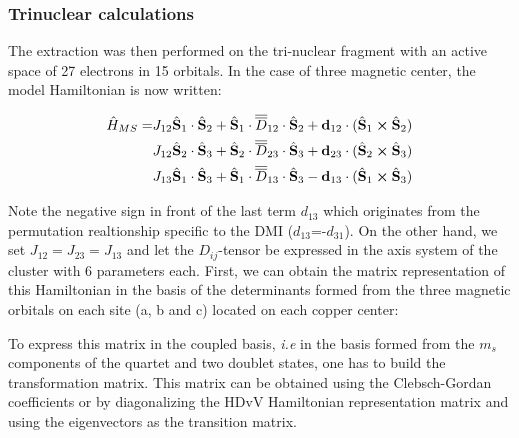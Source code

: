 \documentclass[12pt]{report}
\numberwithin{equation}{section}
\begin{document}
\subsubsection*{Trinuclear calculations}

The extraction was then performed on the tri-nuclear fragment with an active space of 27 electrons in 15 orbitals.
In the case of three magnetic center, the model Hamiltonian is now written:


\begin{equation}
    \begin{split}
    \hat{H}_{MS}=&J_{12} \hat{\vb S}_1 \cdot \hat{\vb S}_2 + \hat{\vb S}_1 \cdot\overline{\overline{D}}_{12} \cdot \hat{\vb S}_2 + \vb{d}_{12} \cdot (\hat{\vb S}_1 \cross \hat{\vb S}_2)\\
    &J_{12} \hat{\vb S}_2 \cdot \hat{\vb S}_3 + \hat{\vb S}_2 \cdot\overline{\overline{D}}_{23} \cdot \hat{\vb S}_3 + \vb{d}_{23} \cdot (\hat{\vb S}_2 \cross \hat{\vb S}_3)\\
    &J_{13} \hat{\vb S}_1 \cdot \hat{\vb S}_3 + \hat{\vb S}_1 \cdot\overline{\overline{D}}_{13} \cdot \hat{\vb S}_3 - \vb{d}_{13} \cdot (\hat{\vb S}_1 \cross \hat{\vb S}_3)
    \end{split}
\end{equation}

Note the negative sign in front of the last term $d_{13}$ which originates from the permutation realtionship specific to the DMI ($d_{13}$=-$d_{31}$).
On the other hand, we set $J_{12}=J_{23}=J_{13}$ and let the $D_{ij}$-tensor be expressed in the axis system of the cluster with 6 parameters each.
First, we can obtain the matrix representation of this Hamiltonian in the basis of the determinants formed from the three magnetic orbitals on each site (a, b and c) located on each copper center:


To express this matrix in the coupled basis, \textit{i.e} in the basis formed from the $m_s$ components of the quartet and two doublet states, one has to build the transformation matrix.
This matrix can be obtained using the Clebsch-Gordan coefficients or by diagonalizing the HDvV Hamiltonian representation matrix and using the eigenvectors as the transition matrix.
\end{document}
